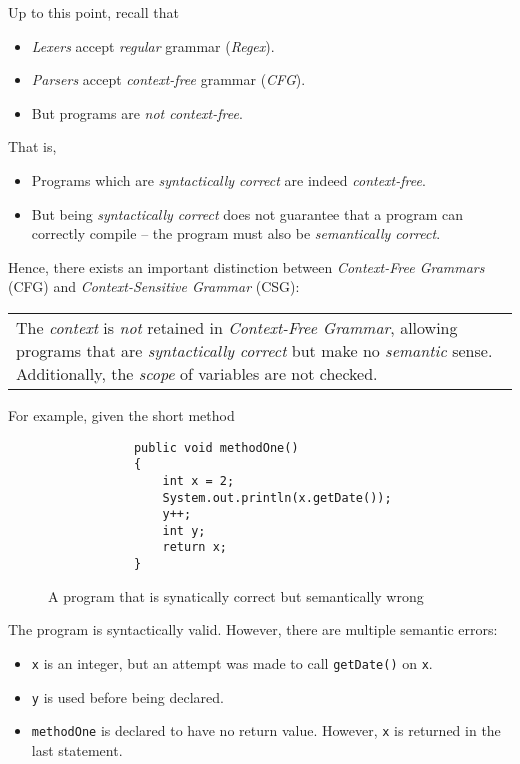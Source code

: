 \begin{remark}
    Up to this point, recall that
    \begin{itemize}
        \item \textit{Lexers} accept \textit{regular} grammar (\textit{Regex}).
        \item \textit{Parsers} accept \textit{context-free} grammar (\textit{CFG}).
        \item But programs are \textit{not context-free}.
    \end{itemize}
    
    That is,
    \begin{itemize}
        \item Programs which are \textit{syntactically correct} are indeed \textit{context-free}.
        \item But being \textit{syntactically correct} does not guarantee that a program can correctly compile -- the program must also be \textit{semantically correct}.
    \end{itemize}
    
    Hence, there exists an important distinction between \textit{Context-Free Grammars} (CFG) and \textit{Context-Sensitive Grammar} (CSG):
    
    \begin{tabular}{@{} |p{}}
        The \textit{context} is \textit{not} retained in \textit{Context-Free Grammar}, allowing programs that are \textit{syntactically correct} but make no \textit{semantic} sense. Additionally, the \textit{scope} of variables are not checked.
    \end{tabular}
\end{remark}

\begin{example}
    For example, given the short method
    \begin{figure}[H]
        \centering
        \begin{verbatim}
            public void methodOne()
            {
                int x = 2;
                System.out.println(x.getDate());
                y++;
                int y;
                return x;
            }
        \end{verbatim}
        \caption{A program that is synatically correct but semantically wrong}
        \label{prog:syntactically-correct-semantically-wrong}
    \end{figure}
    
    The program is syntactically valid. However, there are multiple semantic errors:
    \begin{itemize}
        \item \texttt{x} is an integer, but an attempt was made to call \texttt{getDate()} on \texttt{x}.
        \item \texttt{y} is used before being declared.
        \item \texttt{methodOne} is declared to have no return value. However, \texttt{x} is returned in the last statement.
    \end{itemize}
\end{example}

